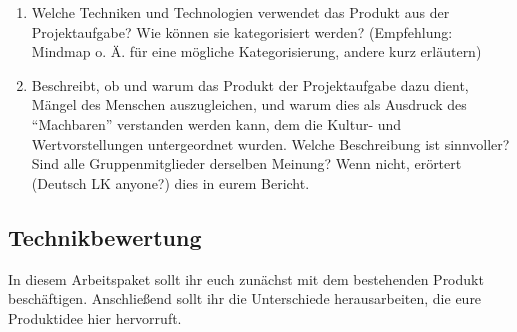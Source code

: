 \documentclass[headinclude=true]{scrartcl}
\begin{document}
\begin{enumerate}
	\item
	     Welche Techniken und Technologien verwendet das Produkt aus der Projektaufgabe? Wie können sie kategorisiert werden? (Empfehlung: Mindmap o. Ä. für eine mögliche Kategorisierung, andere kurz erläutern)
	\item
	      Beschreibt, ob und warum das Produkt der Projektaufgabe dazu dient, Mängel des Menschen auszugleichen, und warum dies als Ausdruck des “Machbaren” verstanden werden kann, dem die Kultur- und Wertvorstellungen untergeordnet wurden. Welche Beschreibung ist sinnvoller? Sind alle Gruppenmitglieder derselben Meinung? Wenn nicht, erörtert (Deutsch LK anyone?) dies in eurem Bericht.
\end{enumerate}

\subsection{Technikbewertung} \label{technikbewertung}
In diesem Arbeitspaket sollt ihr euch zunächst mit dem bestehenden Produkt beschäftigen. Anschließend sollt ihr die Unterschiede herausarbeiten, die eure Produktidee hier hervorruft.
\end{document}
